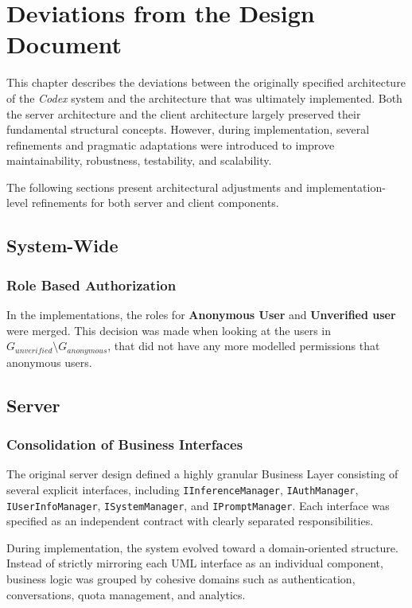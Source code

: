 
\chapter{Deviations from the Design Document}

This chapter describes the deviations between the originally specified architecture of the \textit{Codex} system and the architecture that was ultimately implemented. Both the server architecture and the client architecture largely preserved their fundamental structural concepts. However, during implementation, several refinements and pragmatic adaptations were introduced to improve maintainability, robustness, testability, and scalability.

The following sections present architectural adjustments and implementation-level refinements for both server and client components.

\section{System-Wide}
\subsection{Role Based Authorization}
In the implementations, the roles for \textbf{Anonymous User} and \textbf{Unverified user} were merged. 
This decision was made when looking at the users in $G_{unverified} \setminus G_{anonymous}$, that did not have any more modelled permissions that anonymous users.

\section{Server}

\subsection{Consolidation of Business Interfaces}

The original server design defined a highly granular Business Layer consisting of several explicit interfaces, including \texttt{IInferenceManager}, \texttt{IAuthManager}, \texttt{IUserInfoManager}, \texttt{ISystemManager}, and \texttt{IPromptManager}. Each interface was specified as an independent contract with clearly separated responsibilities.

During implementation, the system evolved toward a domain-oriented structure. Instead of strictly mirroring each UML interface as an individual component, business logic was grouped by cohesive domains such as authentication, conversations, quota management, and analytics.

